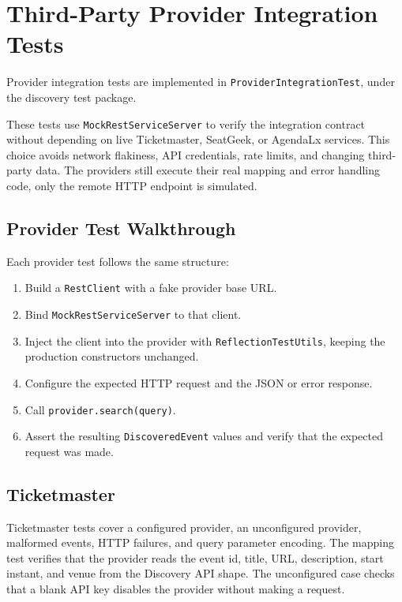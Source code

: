 \chapter{Third-Party Provider Integration Tests} \label{cap:thirdparty}

Provider integration tests are implemented in \texttt{ProviderIntegrationTest}, under the discovery test package.

These tests use \texttt{MockRestServiceServer} to verify the integration contract without depending on live Ticketmaster, SeatGeek, or AgendaLx services. This choice avoids network flakiness, API credentials, rate limits, and changing third-party data. The providers still execute their real mapping and error handling code, only the remote HTTP endpoint is simulated.

\section{Provider Test Walkthrough}

Each provider test follows the same structure:

\begin{enumerate}
\item Build a \texttt{RestClient} with a fake provider base URL.
\item Bind \texttt{MockRestServiceServer} to that client.
\item Inject the client into the provider with \texttt{ReflectionTestUtils}, keeping the production constructors unchanged.
\item Configure the expected HTTP request and the JSON or error response.
\item Call \texttt{provider.search(query)}.
\item Assert the resulting \texttt{DiscoveredEvent} values and verify that the expected request was made.
\end{enumerate}

\newpage 

\section{Ticketmaster}

Ticketmaster tests cover a configured provider, an unconfigured provider, malformed events, HTTP failures, and query parameter encoding. The mapping test verifies that the provider reads the event id, title, URL, description, start instant, and venue from the Discovery API shape. The unconfigured case checks that a blank API key disables the provider without making a request.

